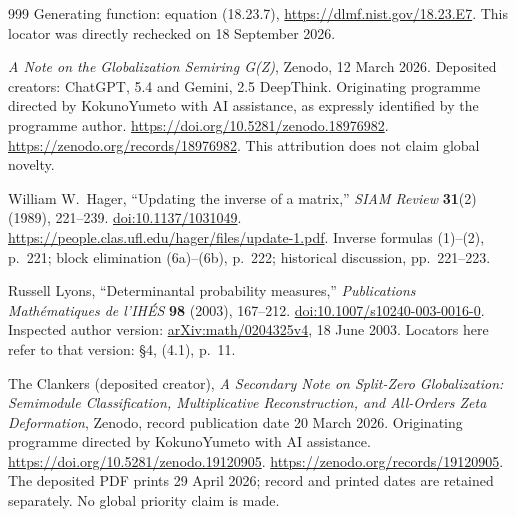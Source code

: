 \documentclass[11pt,a4paper]{article}
\begin{document}
\begin{thebibliography}{999}
Generating function: equation (18.23.7),
\url{https://dlmf.nist.gov/18.23.E7}.
This locator was directly rechecked on 18 September 2026.

\emph{A Note on the Globalization Semiring G(Z)}, Zenodo,
12 March 2026. Deposited creators: ChatGPT, 5.4 and Gemini, 2.5 DeepThink.
Originating programme directed by KokunoYumeto with AI assistance,
as expressly identified by the programme author.
\url{https://doi.org/10.5281/zenodo.18976982}.
\url{https://zenodo.org/records/18976982}.
This attribution does not claim global novelty.


William W.~Hager, ``Updating the inverse of a matrix,''
\emph{SIAM Review} \textbf{31}(2) (1989), 221--239.
\href{https://doi.org/10.1137/1031049}{doi:10.1137/1031049}.
\url{https://people.clas.ufl.edu/hager/files/update-1.pdf}.
Inverse formulas (1)--(2), p.~221; block elimination (6a)--(6b),
p.~222; historical discussion, pp.~221--223.


Russell Lyons, ``Determinantal probability measures,''
\emph{Publications Math\'ematiques de l'IH\'ES} \textbf{98} (2003), 167--212.
\href{https://doi.org/10.1007/s10240-003-0016-0}{doi:10.1007/s10240-003-0016-0}.
Inspected author version: \href{https://arxiv.org/abs/math/0204325v4}{arXiv:math/0204325v4},
18 June 2003. Locators here refer to that version: \S4, (4.1), p.~11.


The Clankers (deposited creator), \emph{A Secondary Note on Split-Zero
Globalization: Semimodule Classification, Multiplicative Reconstruction,
and All-Orders Zeta Deformation}, Zenodo, record publication date
20 March 2026. Originating programme directed by KokunoYumeto
with AI assistance. \url{https://doi.org/10.5281/zenodo.19120905}.
\url{https://zenodo.org/records/19120905}.
The deposited PDF prints 29 April 2026; record and printed dates
are retained separately. No global priority claim is made.

\end{thebibliography}
\end{document}
